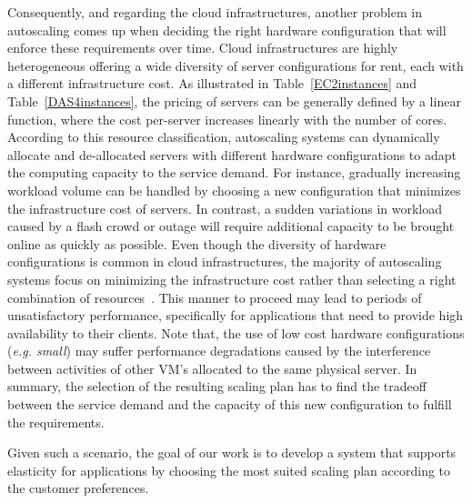 Consequently, and regarding the cloud infrastructures, another problem in autoscaling comes up when deciding the right hardware configuration that will enforce these requirements over time. Cloud infrastructures are highly heterogeneous offering a wide diversity of server configurations for rent, each with a different infrastructure cost. As illustrated in Table~\ref{EC2instances} and Table~\ref{DAS4instances}, the pricing of servers can be generally defined by a linear function, where the cost per-server increases linearly with the number of cores. According to this resource classification, autoscaling systems can dynamically allocate and de-allocated servers with different hardware configurations to adapt the computing capacity to the service demand. For instance, gradually increasing workload volume can be handled by choosing a new configuration that minimizes the infrastructure cost of servers. In contrast, a sudden variations in workload caused by a flash crowd or outage will require additional capacity to be brought online as quickly as possible. Even though the diversity of hardware configurations is common in cloud infrastructures, the majority of autoscaling systems focus on minimizing the infrastructure cost rather than selecting a right combination of resources~\cite{herbst_2013,urgaonkar_agile_2008,dejavu2012}. This manner to proceed may lead to periods of unsatisfactory performance, specifically for applications that need to provide high availability to their clients. Note that, the use of low cost hardware configurations (\emph{e.g. small}) may suffer performance degradations caused by the interference between activities of other VM's allocated to the same physical server. In summary, the selection of the resulting scaling plan has to find the tradeoff between the service demand and the capacity of this new configuration to fulfill the requirements.

Given such a scenario, the goal of our work is to develop a system that supports elasticity for applications by choosing the most suited scaling plan according to the customer preferences.















